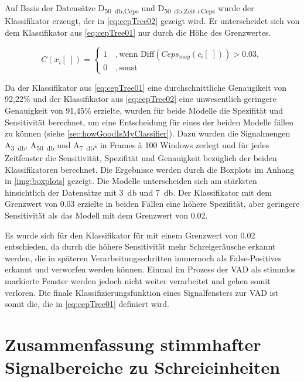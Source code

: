 Auf Basis der Datensätze D\textsubscript{\SI{50}{\decibel},Ceps} und D\textsubscript{\SI{50}{\decibel},Zeit+Ceps} wurde der Klassifikator erzeugt, der in \autoref{eq:cepTree02} gezeigt wird. Er unterscheidet sich von dem Klassifikator aus \autoref{eq:cepTree01} nur durch die Höhe des Grenzwertes.

\begin{equation}
C(x_i[\;]) = \begin{cases}
1 \quad , \text{wenn  Diff}(Ceps_{mag}(c_i[\;])) > 0.03, \\
0 \quad , \text{sonst}
\end{cases}
\label{eq:cepTree02}
\end{equation}

Da der Klassifikator aus \autoref{eq:cepTree01} eine durchschnittliche Genaugikeit von 92,22\% und der Klassifikator aus \autoref{eq:cepTree02} eine unwesentlich geringere Genauigkeit von 91,45\% erzielte, wurden für beide Modelle die Spezifität und Sensitivität berechnet, um eine Entscheidung für eines der beiden Modelle fällen zu können (siehe \autoref{sec:howGoodIsMyClassifier}). Dazu wurden die Signalmengen A\textsubscript{\SI{3}{\decibel}}, A\textsubscript{\SI{50}{\decibel}} und A\textsubscript{\SI{7}{\decibel}*} in Frames \`{a} 100 Windows zerlegt und für jedes Zeitfenster die Sensitivität, Spezifität und Genauigkeit bezüglich der beiden Klassifikatoren berechnet. Die Ergebnisse werden durch die Boxplots im Anhang in \autoref{img:boxplots} gezeigt. Die Modelle unterscheiden sich am stärksten hinsichtlich der Datensätze mit \SI{3}{\decibel} und \SI{7}{\decibel}. Der Klassifikator mit dem Grenzwert von 0.03 erzielte in beiden Fällen eine höhere Spezifität, aber geringere Sensitivität als das Modell mit dem Grenzwert von 0.02. 

Es wurde sich für den Klassifikator für mit einem Grenzwert von 0.02 entschieden, da durch die höhere Sensitivität mehr Schreigeräusche erkannt werden, die in späteren Verarbeitungsschritten immernoch als False-Positives erkannt und verworfen werden können. Einmal im Prozess der VAD als stimmlos markierte Fenster werden jedoch nicht weiter verarbeitet und gehen somit \glqq verloren\grqq. Die finale Klassifizierungsfunktion eines Signalfensters zur VAD ist somit die, die in \autoref{eq:cepTree01} definiert wird.

\section{Zusammenfassung stimmhafter Signalbereiche zu Schreieinheiten}
\label{sec:marking_cry-units_new}

